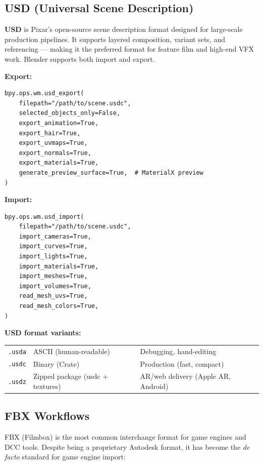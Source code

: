 \subsection{USD (Universal Scene Description)}

\textbf{USD} is Pixar's open-source scene description format designed for large-scale production pipelines. It supports layered composition, variant sets, and referencing --- making it the preferred format for feature film and high-end VFX work. Blender supports both import and export.

\textbf{Export:}
\begin{lstlisting}
bpy.ops.wm.usd_export(
    filepath="/path/to/scene.usdc",
    selected_objects_only=False,
    export_animation=True,
    export_hair=True,
    export_uvmaps=True,
    export_normals=True,
    export_materials=True,
    generate_preview_surface=True,  # MaterialX preview
)
\end{lstlisting}

\textbf{Import:}
\begin{lstlisting}
bpy.ops.wm.usd_import(
    filepath="/path/to/scene.usdc",
    import_cameras=True,
    import_curves=True,
    import_lights=True,
    import_materials=True,
    import_meshes=True,
    import_volumes=True,
    read_mesh_uvs=True,
    read_mesh_colors=True,
)
\end{lstlisting}

\textbf{USD format variants:}

\begin{center}
\begin{tabularx}{\textwidth}{L{2cm}L{3.5cm}X}
\toprule
{}
 &  &  \\
\midrule
\texttt{.usda} & ASCII (human-readable) & Debugging, hand-editing \\
\texttt{.usdc} & Binary (Crate) & Production (fast, compact) \\
\texttt{.usdz} & Zipped package (usdc + textures) & AR/web delivery (Apple AR, Android) \\
\bottomrule
\end{tabularx}
\end{center}

\subsection{FBX Workflows}

FBX (Filmbox) is the most common interchange format for game engines and DCC tools. Despite being a proprietary Autodesk format, it has become the \textit{de facto} standard for game engine import:

